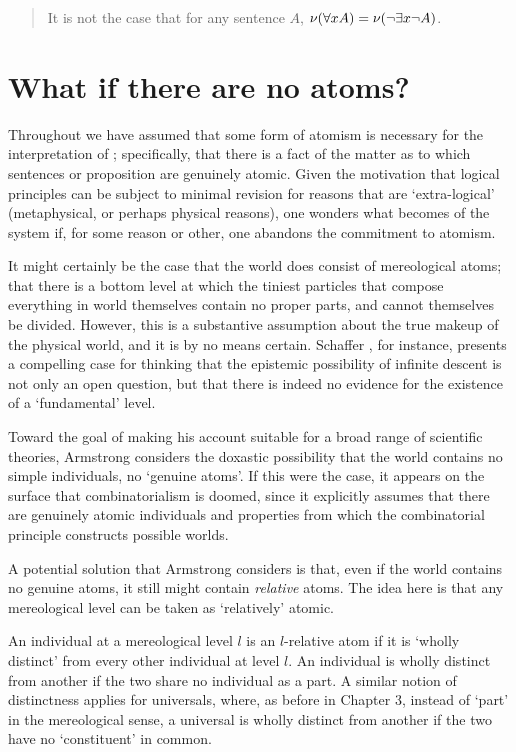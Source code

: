 \begin{quote}
It is not the case that for any sentence $A$, $\mathcal{\nu}(\forall xA)=\mathcal{\nu}(\neg\exists x\neg A)$.
\end{quote}

\noindent

\section{What if there are no atoms?}\label{atomless}

Throughout we have assumed that some form of atomism is necessary for the interpretation of \GO; specifically, that there is a fact of the matter as to which sentences or proposition are genuinely atomic. Given the motivation that logical principles can be subject to minimal revision for reasons that are `extra-logical' (metaphysical, or perhaps physical reasons), one wonders what becomes of the system if, for some reason or other, one abandons the commitment to atomism.

It might certainly be the case that the world does consist of mereological atoms; that there is a bottom level at which the tiniest particles that compose everything in world themselves contain no proper parts, and cannot themselves be divided. However, this is a substantive assumption about the true makeup of the physical world, and it is by no means certain. Schaffer \citeyear{Schaffer:03}, for instance, presents a compelling case for thinking that the epistemic possibility of infinite descent is not only an open question, but that there is indeed no evidence for the existence of a `fundamental' level.

Toward the goal of making his account suitable for a broad range of scientific theories, Armstrong considers the doxastic possibility that the world contains no simple individuals, no `genuine atoms'. If this were the case, it appears on the surface that combinatorialism is doomed, since it explicitly assumes that there are genuinely atomic individuals and properties from which the combinatorial principle constructs possible worlds. 

A potential solution that Armstrong considers is that, even if the world contains no genuine atoms, it still might contain \emph{relative} atoms. The idea here is that any mereological level can be taken as `relatively' atomic.

An individual at a mereological level $l$ is an $l$-relative atom if it is `wholly distinct' from every other individual at level $l$. An individual is wholly distinct from another if the two share no individual as a part. A similar notion of distinctness applies for universals, where, as before in Chapter 3, instead of `part' in the mereological sense, a universal is wholly distinct from another if the two have no `constituent' in common. 

